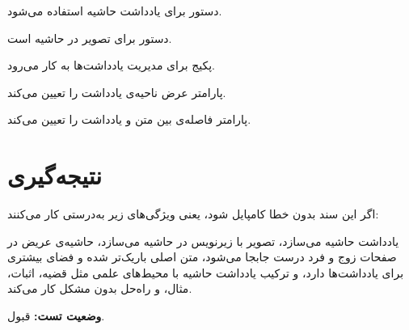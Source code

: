 \documentclass{matinbook}
\begin{document}
دستور  برای یادداشت حاشیه استفاده می‌شود.

دستور  برای تصویر در حاشیه است.

پکیج  برای مدیریت یادداشت‌ها به کار می‌رود.

پارامتر  عرض ناحیه‌ی یادداشت را تعیین می‌کند.

پارامتر  فاصله‌ی بین متن و یادداشت را تعیین می‌کند.

\section{نتیجه‌گیری}
\label{sec:conclusion}

اگر این سند بدون خطا کامپایل شود، یعنی ویژگی‌های زیر
به‌درستی کار می‌کنند:

 یادداشت حاشیه می‌سازد،
 تصویر با زیرنویس در حاشیه
می‌سازد، حاشیه‌ی عریض در صفحات زوج و فرد درست جابجا می‌شود،
متن اصلی باریک‌تر شده و فضای بیشتری برای یادداشت‌ها دارد،
و ترکیب یادداشت حاشیه با محیط‌های علمی مثل قضیه، اثبات،
مثال، و راه‌حل بدون مشکل کار می‌کند.

\textbf{وضعیت تست:} قبول.
\end{document}
